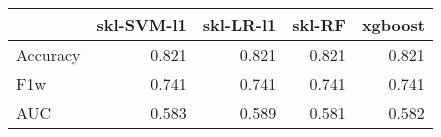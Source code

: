 \begin{tabular}{lrrrr}
\toprule
{} &  skl-SVM-l1 &  skl-LR-l1 &  skl-RF &  xgboost \\
\midrule
Accuracy &       0.821 &      0.821 &   0.821 &    0.821 \\
F1w      &       0.741 &      0.741 &   0.741 &    0.741 \\
AUC      &       0.583 &      0.589 &   0.581 &    0.582 \\
\bottomrule
\end{tabular}
